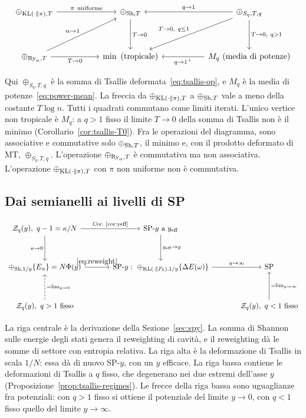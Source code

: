 \begin{equation*}
\begin{tikzcd}[column sep=5.2em,row sep=3.6em]
\oplus_{\KL(\cdot\|\pi),T} \arrow[r,"\pi\ \text{uniforme}"] & \oplus_{\Sh,T} \arrow[d,"T\to0"] & \oplus_{S_q,T,q} \arrow[l,"q\to1"'] \arrow[dl,"{T\to0,\ q\le1}"'] \arrow[d,"{T\to0,\ q>1}"] \\
\oplus_{\Ry_\alpha,T} \arrow[ur,"\alpha\to1"] \arrow[r,"T\to0"'] & \min\ \text{(tropicale)} & M_q\ \text{(media di potenze)} \arrow[l,"q\to1^+"]
\end{tikzcd}
\end{equation*}

Qui $\oplus_{S_q,T,q}$ è la somma di Tsallis deformata~\eqref{eq:tsallis-op}, e $M_q$ è la media di potenze~\eqref{eq:power-mean}.
La freccia da $\oplus_{\mathrm{KL}(\cdot\|\pi),T}$ a $\oplus_{\mathrm{Sh},T}$ vale a meno della costante $T\log n$.
Tutti i quadrati commutano come limiti iterati.
L'unico vertice non tropicale è $M_q$: a $q>1$ fisso il limite $T\to0$ della somma di Tsallis non è il minimo (Corollario~\ref{cor:tsallis-T0}).
Fra le operazioni del diagramma, sono associative e commutative solo $\oplus_{\mathrm{Sh},T}$, il minimo e, con il prodotto deformato di MT, $\oplus_{S_q,T,q}$.
L'operazione $\oplus_{\mathrm{Ry}_\alpha,T}$ è commutativa ma non associativa.
L'operazione $\oplus_{\mathrm{KL}(\cdot\|\pi),T}$ con $\pi$ non uniforme non è commutativa.

\subsection{Dai semianelli ai livelli di SP}

\begin{equation*}
\begin{tikzcd}[column sep=3.4em,row sep=3.4em]
\mathcal Z_q(y),\ q-1=\kappa/N \arrow[r,"\text{Cor.~\ref{cor:yeff}}"] \arrow[d,"\kappa\to0"'] & \text{SP-}y\ \text{a}\ y_{\mathrm{eff}} \arrow[d,"y_{\mathrm{eff}}\to y"] & \\
\oplus_{\Sh,1/y}\{E_\alpha\}=N\Phi(y) \arrow[r,"\eqref{eq:reweight}"] & \text{SP-}y:\ \oplus_{\KL(\cdot\|P_0),1/y}\{\Delta E(\omega)\} \arrow[r,"y\to\infty"] & \text{SP} \\
\mathcal Z_q(y),\ q>1\ \text{fisso} \arrow[u,dashed,"{=\lim_{y\to0}}"'] & & \mathcal Z_q(y),\ q<1\ \text{fisso} \arrow[u,"{=\lim_{y\to\infty}}"']
\end{tikzcd}
\end{equation*}

La riga centrale è la derivazione della Sezione~\ref{sec:spy}.
La somma di Shannon sulle energie degli stati genera il reweighting di cavità, e il reweighting dà le somme di settore con entropia relativa.
La riga alta è la deformazione di Tsallis in scala $1/N$: essa dà di nuovo SP-$y$, con un $y$ efficace.
La riga bassa contiene le deformazioni di Tsallis a $q$ fisso, che degenerano nei due estremi dell'asse $y$ (Proposizione~\ref{prop:tsallis-regimes}).
Le frecce della riga bassa sono uguaglianze fra potenziali: con $q>1$ fisso si ottiene il potenziale del limite $y\to0$, con $q<1$ fisso quello del limite $y\to\infty$.


